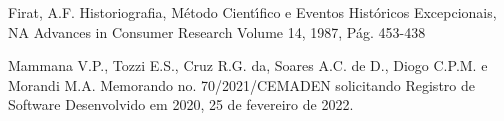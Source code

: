 \documentclass[
12pt,		%
openright,	%
twoside,  %
a4paper,			%
chapter=TITLE,		%
english,			%
french,				%
spanish,			%
brazil				%
]{USPSC-classe/USPSC}
\begin{document}
\begin{flushleft}
\begin{flushleft}
\begin{flushleft}
\begin{flushleft}
\begin{flushleft}
\begin{flushleft}
\begin{flushleft}
\begin{flushleft}
[Firat, 1987] Firat, A.F. Historiografia, M\'etodo Cient\'{\i}fico e Eventos Hist\'oricos Excepcionais, NA Advances in Consumer Research Volume 14, 1987, P\'ag. 453-438
\end{flushleft}


\end{flushleft}


\end{flushleft}


\end{flushleft}


\end{flushleft}


\end{flushleft}


\end{flushleft}


\end{flushleft}


\begin{flushleft}
\begin{flushleft}
\begin{flushleft}
\begin{flushleft}
\begin{flushleft}
\begin{flushleft}
\begin{flushleft}
\begin{flushleft}
[MAMMANA et al., 2022] Mammana V.P., Tozzi E.S., Cruz R.G. da, Soares A.C. de D., Diogo C.P.M. e Morandi M.A. Memorando no. 70/2021/CEMADEN solicitando Registro de Software Desenvolvido em 2020, 25 de fevereiro de 2022.
\end{flushleft}


\end{flushleft}


\end{flushleft}


\end{flushleft}


\end{flushleft}


\end{flushleft}


\end{flushleft}


\end{flushleft}
\end{document}
